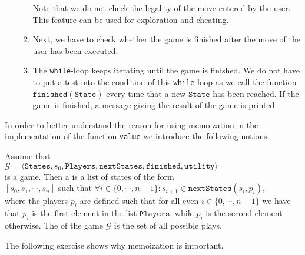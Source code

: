 \begin{enumerate}
\begin{enumerate}
            Note that we do not check the legality of the move entered by the user.  This feature can be used
            for exploration and cheating.
      \item Next, we have to check whether the game is finished after the  move of the user has been executed.
      \item The \texttt{while}-loop keeps iterating until the game is finished.
            We do not have to put a test into the condition of this \texttt{while}-loop as we call the function
            $\texttt{finished}(\texttt{State})$ every time that a new $\texttt{State}$ has been reached.
            If the game is finished, a message giving the result of the game is printed.
      \end{enumerate}
\end{enumerate}
In order to better understand the reason for using memoization in the implementation of the function
\texttt{value} we introduce the following notions.
\begin{Definition}
  Assume that
  \\[0.2cm]
  \hspace*{1.3cm}
  $\mathcal{G} = \langle \texttt{States}, s_0, \texttt{Players}, \texttt{nextStates}, \texttt{finished},\texttt{utility} \rangle$
  \\[0.2cm]
  is a game. Then a  is a list of states of the form 
  \\[0.2cm]
  \hspace*{1.3cm}
  $[s_0, s_1, \cdots, s_n]$ \quad such that \quad $\forall i\in\{0,\cdots,n-1\}: s_{i+1} \in \texttt{nextStates}(s_i, p_i)$,
  \\[0.2cm]
  where the players $p_i$ are defined such that for all even $i\in\{0,\cdots,n-1\}$ we have that $p_i$ is the
  first element in the list $\texttt{Players}$, while $p_i$ is the second element otherwise.
  The  of the game $\mathcal{G}$ is the set of all possible plays.  \eoxs
\end{Definition}

\noindent
The following exercise shows why memoization is important.

